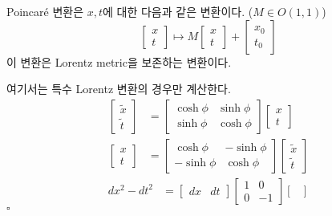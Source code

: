 \documentclass[10pt,a4paper]{article}
\renewenvironment{proof}{{\sffamily\bfseries Proof:~}}{\hfill$\square$}
\begin{document}
\begin{tcolorbox}[title=Poincaré 변환]
Poincaré 변환은 $x, t$에 대한 다음과 같은 변환이다. ($M \in O(1, 1)$)
\[\begin{bmatrix}
    x \\ t
\end{bmatrix} \mapsto M\begin{bmatrix}
    x \\ t
\end{bmatrix} + \begin{bmatrix}
    x_0 \\ t_0
\end{bmatrix}\]
이 변환은 Lorentz metric을 보존하는 변환이다.
\end{tcolorbox}
\begin{proof}
여기서는 특수 Lorentz 변환의 경우만 계산한다.
\begin{align*}
    \begin{bmatrix}
        \tilde{x} \\ \tilde{t}
    \end{bmatrix} &= \begin{bmatrix}
        \cosh{\phi} & \sinh{\phi}\\
        \sinh{\phi} & \cosh{\phi}
    \end{bmatrix}\begin{bmatrix}
        x \\ t
    \end{bmatrix}\\
    \begin{bmatrix}
        x \\ t
    \end{bmatrix} &= \begin{bmatrix}
        \cosh{\phi} & -\sinh{\phi}\\
        -\sinh{\phi} & \cosh{\phi}
    \end{bmatrix}
    \begin{bmatrix}
        \tilde{x} \\ \tilde{t} 
    \end{bmatrix}
\end{align*}
\begin{align*}
    dx^2 - dt^2 &= \begin{bmatrix}
        dx & dt
    \end{bmatrix}
    \begin{bmatrix}
        1 & 0\\0 & -1
    \end{bmatrix}
    \begin{bmatrix}

\end{bmatrix}
\end{align*}
\end{proof}
\end{document}
